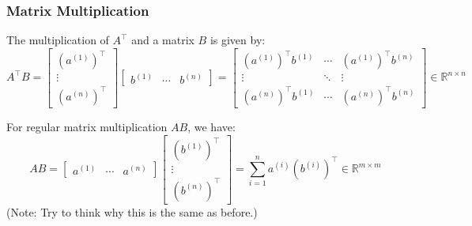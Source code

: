     \subsubsection{Matrix Multiplication}
    \begin{definition}
        The multiplication of \( A^\top \) and a matrix \( B \) is given by:
        \begin{equation}
            A^\top B = \begin{bmatrix}
                (a^{(1)})^\top \\
                \vdots \\
                (a^{(n)})^\top
                \end{bmatrix}
                \begin{bmatrix}
                b^{(1)} & \cdots & b^{(n)}
                \end{bmatrix}
                = \begin{bmatrix}
                (a^{(1)})^\top b^{(1)} & \cdots & (a^{(1)})^\top b^{(n)} \\
                \vdots & \ddots & \vdots \\
                (a^{(n)})^\top b^{(1)} & \cdots & (a^{(n)})^\top b^{(n)}
                \end{bmatrix} \in \mathbb{R}^{n \times n}
        \end{equation}

        For regular matrix multiplication \( AB \), we have:
        \begin{equation}
            AB = \begin{bmatrix}
                a^{(1)} & \cdots & a^{(n)}
                \end{bmatrix}
                \begin{bmatrix}
                (b^{(1)})^\top \\
                \vdots \\
                (b^{(n)})^\top
                \end{bmatrix}
                = \sum_{i=1}^{n} a^{(i)} (b^{(i)})^\top \in \mathbb{R}^{m \times m}
        \end{equation}
        (Note: Try to think why this is the same as before.)
    \end{definition}

